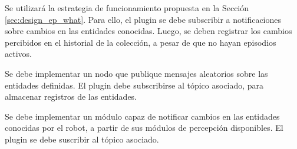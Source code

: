 Se utilizará la estrategia de funcionamiento propuesta en la Sección \ref{sec:design_ep_what}. Para ello, el plugin se debe subscribir a notificaciones sobre cambios en las entidades conocidas. Luego, se deben registrar los cambios percibidos en el historial de la colección, a pesar de que no hayan episodios activos.

Se debe implementar un nodo que publique mensajes aleatorios sobre las entidades definidas. El plugin debe subscribirse al tópico asociado, para almacenar registros de las entidades.

Se debe implementar un módulo capaz de notificar cambios en las entidades conocidas por el robot, a partir de sus módulos de percepción disponibles. El plugin se debe suscribir al tópico asociado.















